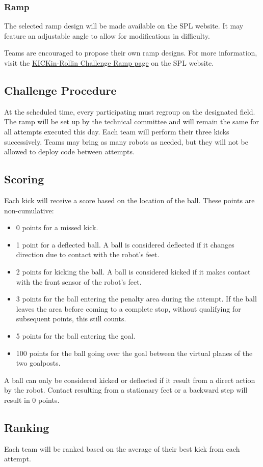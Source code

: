 \subsubsection{Ramp}

The selected ramp design will be made available on the SPL website. 
It may feature an adjustable angle to allow for modifications in difficulty.  

Teams are encouraged to propose their own ramp designs. 
For more information, visit the \href{https://spl.robocup.org/kickin-rollin-challenge-ramp/}{KICKin-Rollin Challenge Ramp page} on the SPL website.

\subsection{Challenge Procedure}

At the scheduled time, every participating must regroup on the designated field. 
The ramp will be set up by the technical committee and will remain the same for all attempts executed this day.
Each team will perform their three kicks successively.
Teams may bring as many robots as needed, but they will not be allowed to deploy code between attempts.

\subsection{Scoring}

Each kick will receive a score based on the location of the ball.
These points are non-cumulative: 

\begin{itemize}
	\item 0 points for a missed kick.
	\item 1 point for a deflected ball.
	A ball is considered deflected if it changes direction due to contact with the robot's feet.
	\item 2 points for kicking the ball.
	A ball is considered kicked if it makes contact with the front sensor of the robot's feet.
	\item 3 points for the ball entering the penalty area during the attempt. 
	If the ball leaves the area before coming to a complete stop, without qualifying for subsequent points, this still counts. 
	\item 5 points for the ball entering the goal. 
	\item 100 points for the ball going over the goal between the virtual planes of the two goalposts. 
  \end{itemize}

  A ball can only be considered kicked or deflected if it result from a direct action by the robot.
  Contact resulting from a stationary feet or a backward step will result in 0 points.

  \subsection{Ranking}

  Each team will be ranked based on the average of their best kick from each attempt.